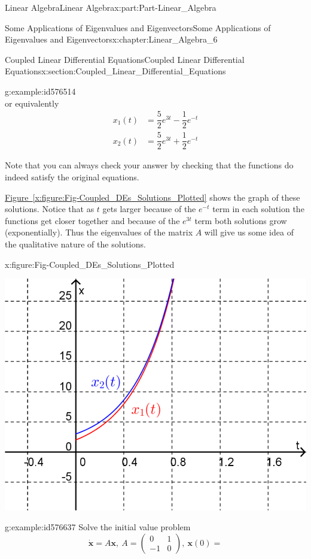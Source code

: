 \documentclass[oneside,10pt,]{book}
\newcommand{\xreffont}{\relax}
\numberwithin{equation}{section}
\newcommand{\bm}[1]{\boldsymbol{#1}}
\newcommand{\amp}{&}
\begin{document}
\begin{partptx}{Linear Algebra}{}{Linear Algebra}{}{}{x:part:Part-Linear_Algebra}
\begin{chapterptx}{Some Applications of Eigenvalues and Eigenvectors}{}{Some Applications of Eigenvalues and Eigenvectors}{}{}{x:chapter:Linear_Algebra_6}
\begin{sectionptx}{Coupled Linear Differential Equations}{}{Coupled Linear Differential Equations}{}{}{x:section:Coupled_Linear_Differential_Equations}
\begin{example}{}{g:example:id576514}
\begin{equation*}
\end{equation*}
or equivalently%
\begin{align*}
x_1(t) \amp = \dfrac{5}{2} e^{3t} - \dfrac{1}{2} e^{-t}\\
x_2(t) \amp = \dfrac{5}{2} e^{3t} + \dfrac{1}{2} e^{-t}
\end{align*}
%
\par
Note that you can always check your answer by checking that the functions do indeed satisfy the original equations.%
\par
\hyperref[x:figure:Fig-Coupled_DEs_Solutions_Plotted]{Figure~{\xreffont\ref{x:figure:Fig-Coupled_DEs_Solutions_Plotted}}} shows the graph of these solutions. Notice that as \(t\) gets larger because of the \(e^{-t}\) term in each solution the functions get closer together and because of the \(e^{3t}\) term both solutions grow (exponentially). Thus the eigenvalues of the matrix \(A\) will give us some idea of the qualitative nature of the solutions.%
\begin{figureptx}{}{x:figure:Fig-Coupled_DEs_Solutions_Plotted}{}%
\begin{image}{0.15}{0.7}{0.15}%
\includegraphics[width=\linewidth]{./LinearAlgebra/Images/6/Fig1-solution_curves_plotted.png}
\end{image}%
\tcblower
\end{figureptx}%
\end{example}
\begin{example}{}{g:example:id576637}%
Solve the initial value problem%
\begin{equation*}
\dot{\bm{x}} = A \bm{x}, \: A = 
\begin{pmatrix} 0 \amp 1 \\ -1 \amp 0 \end{pmatrix}, \: \bm{x}(0) = 

\end{equation*}
\end{example}
\end{sectionptx}
\end{chapterptx}
\end{partptx}
\end{document}
